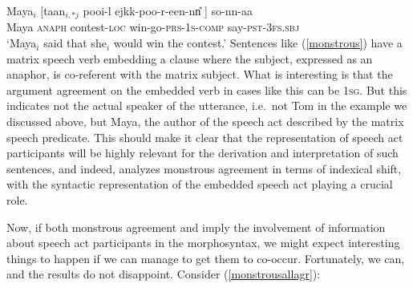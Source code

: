 \documentclass[output=paper, modfonts, nonflat]{langsci/langscibook}
\begin{document}
\ea
  \label{monstrous}\gll Maya$_i$ [taan$_{i,*j}$ poo\textrtailt\textrtailt i-l\E{} \J
  ejkk\A-poo-r-een-nn\U{} ] so-nn-aa\\
  Maya \textsc{anaph} contest-\textsc{loc}{}
  win-go-\textsc{prs}-\textsc{1s}-\textsc{comp}{}
  {} say-\textsc{pst}-\textsc{3fs}.\textsc{sbj}\\
  \glt `Maya$_i$ said that she$_i$ would win the contest.'
\z 
%
Sentences like (\ref{monstrous}) have a matrix speech verb embedding a
clause where the subject, expressed as an anaphor, is co-referent with
the matrix subject.  What is interesting is that the argument
agreement on the embedded verb in cases like this can be
\textsc{1sg}. But this indicates not the actual speaker of the
utterance, i.e.\ not Tom in the example we discussed above, but Maya,
the author of the speech act described by the matrix speech
predicate. This should make it clear that the representation of speech
act participants will be highly relevant for the derivation and
interpretation of such sentences, and indeed, \citet{sundaresan:diss}
analyzes monstrous agreement in terms of indexical shift, with the
syntactic representation of the embedded speech act playing a crucial
role.

Now, if both monstrous agreement and \allagr{} imply the involvement
of information about speech act participants in the morphosyntax, we
might expect interesting things to happen if we can manage to get them
to co-occur. Fortunately, we can, and the results do not
disappoint. Consider (\ref{monstrousallagr}):
\end{document}
